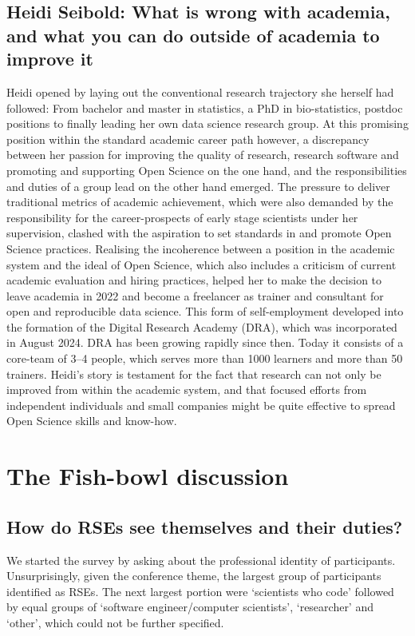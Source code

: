 \documentclass{eceasst}
\begin{document}
\subsection{Heidi Seibold: What is wrong with academia, and what you can do outside of academia to improve it}

Heidi opened by laying out the conventional research trajectory she herself had followed:
From bachelor and master in statistics, a PhD in bio-statistics, postdoc positions to finally leading her own data science research group.
At this promising position within the standard academic career path however,
a discrepancy between her passion for improving the quality of research, research software and promoting and supporting Open Science on the one hand,
and the responsibilities and duties of a group lead on the other hand emerged.
The pressure to deliver traditional metrics of academic achievement,
which were also demanded by the responsibility for the career-prospects of early stage scientists under her supervision,
clashed with the aspiration to set standards in and promote Open Science practices.
Realising the incoherence between a position in the academic system and the ideal of Open Science,
which also includes a criticism of current academic evaluation and hiring practices,
helped her to make the decision to leave academia in 2022
and become a freelancer as trainer and consultant for open and reproducible data science.
This form of self-employment developed into the formation of the Digital Research Academy (DRA),
which was incorporated in August 2024.
DRA has been growing rapidly since then.
Today it consists of a core-team of 3--4 people, which serves more than 1000 learners and more than 50 trainers.
Heidi's story is testament for the fact that research can not only be improved from within the academic system,
and that focused efforts from independent individuals and small companies
might be quite effective to spread Open Science skills and know-how.

\section{The Fish-bowl discussion}

\subsection{How do RSEs see themselves and their duties?}

We started the survey by asking about the professional identity of participants.
Unsurprisingly, given the conference theme, the largest group of participants identified as RSEs.
The next largest portion were `scientists who code' followed by equal groups of
`software engineer/computer scientists', `researcher' and `other', which could not be further specified.
\end{document}
